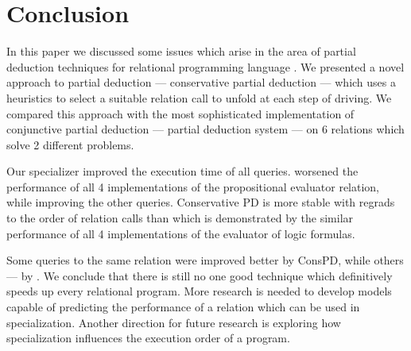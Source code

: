 \section{Conclusion}

In this paper we discussed some issues which arise in the area of partial deduction techniques for relational programming language \mk.
We presented a novel approach to partial deduction --- conservative partial deduction --- which uses a heuristics to select a suitable relation call to unfold at each step of driving.
We compared this approach with the most sophisticated implementation of conjunctive partial deduction --- \ecce partial deduction system --- on 6 relations which solve 2 different problems.

Our specializer improved the execution time of all queries.
\ecce worsened the performance of all 4 implementations of the propositional evaluator relation, while improving the other queries.
Conservative PD is more stable with regrads to the order of relation calls than \ecce which is demonstrated by the similar performance of all 4 implementations of the evaluator of logic formulas.

Some queries to the same relation were improved better by ConsPD, while others --- by \ecce.
We conclude that there is still no one good technique which definitively speeds up every relational program.
More research is needed to develop models capable of predicting the performance of a relation which can be used in specialization.
Another direction for future research is exploring how specialization influences the execution order of a \mk program.